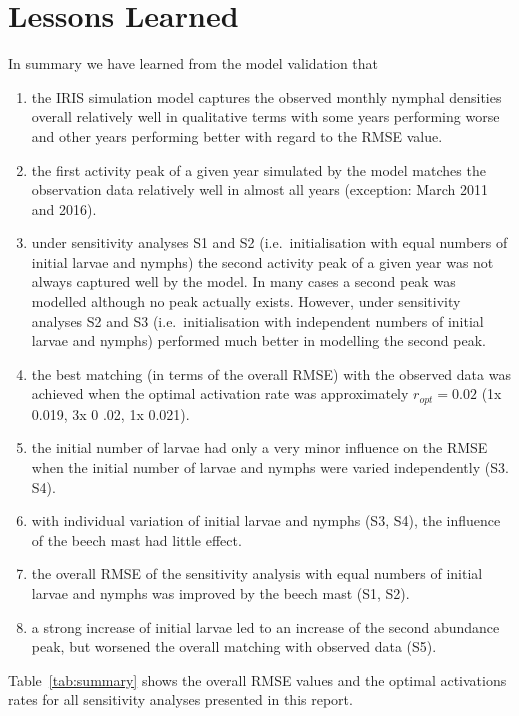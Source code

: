 \documentclass[a4paper, 11pt]{scrartcl}
\begin{document}
\section{Lessons Learned}
In summary we have learned from the model validation that

\begin{enumerate}
\item the IRIS simulation model captures the observed monthly nymphal densities overall relatively well in qualitative terms with some years performing worse and other years
performing better with regard to the RMSE value.
\item the first activity peak of a given year simulated by the model matches the observation data relatively well in almost all years (exception: March 2011 and 2016).
\item under sensitivity analyses S1 and S2 (i.e.\ initialisation with equal numbers of initial larvae and nymphs) the second activity peak of a given year was not always
captured well by the model. In many cases a second peak was modelled although no peak actually exists. However, under sensitivity analyses S2 and S3 (i.e.\ initialisation with
independent numbers of initial larvae and nymphs) performed much better in modelling the second peak.
\item the best matching (in terms of the overall RMSE) with the observed data was achieved when the optimal activation rate was approximately $r_{opt} = 0.02$ (1x 0.019,  3x 0
.02,  1x 0.021).
\item the initial number of larvae had only a very minor influence on the RMSE when the initial number of larvae and nymphs were varied independently (S3. S4).
\item with individual variation of initial larvae and nymphs (S3, S4), the influence of the beech mast had little effect.
\item the overall RMSE of the sensitivity analysis with equal numbers of initial larvae and nymphs was improved by the beech mast (S1, S2).
\item a strong increase of initial larvae led to an increase of the second abundance peak, but worsened the overall matching with observed data (S5).
\end{enumerate}

Table~\ref{tab:summary} shows the overall RMSE values and the optimal activations rates for all sensitivity analyses presented in this report.
\end{document}
